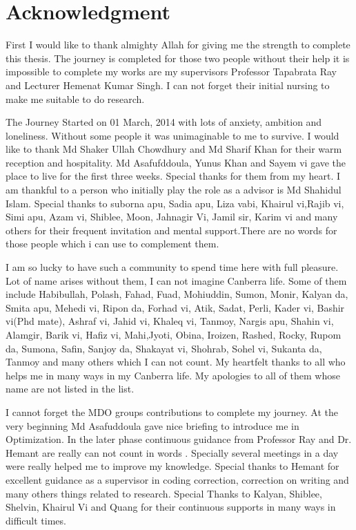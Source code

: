 \chapter*{Acknowledgment}
\pagestyle{plain}

First I would like to thank almighty Allah for giving me the strength to complete this thesis. The journey is completed for those two people without their help it is impossible to complete my works are my supervisors Professor Tapabrata Ray and Lecturer Hemenat Kumar Singh. I can not forget their initial nursing to make me suitable to do research. 

The Journey Started on 01 March, 2014 with lots of anxiety, ambition  and loneliness. Without some people it was unimaginable to me to survive. I would like to thank Md Shaker Ullah Chowdhury and Md Sharif Khan for their warm reception and hospitality.   Md Asafufddoula, Yunus Khan and Sayem vi gave the place to live for the first three weeks. Special thanks for them from my heart. I am thankful to a person who initially play the role as a advisor is Md Shahidul Islam. Special thanks to suborna apu, Sadia apu, Liza vabi, Khairul vi,Rajib vi, Simi apu, Azam vi, Shiblee, Moon, Jahnagir Vi, Jamil sir, Karim vi  and  many others for their frequent invitation and mental support.There are no words for those people which i can use to complement them.

I am so lucky to have such a community to spend time here with full pleasure. Lot of name arises without them, I can not imagine Canberra life. Some of them include Habibullah, Polash, Fahad, Fuad, Mohiuddin, Sumon, Monir, Kalyan da, Smita apu, Mehedi vi, Ripon da, Forhad vi, Atik, Sadat, Perli, Kader vi, Bashir vi(Phd mate), Ashraf vi, Jahid vi, Khaleq vi, Tanmoy, Nargis apu, Shahin vi, Alamgir, Barik vi, Hafiz vi, Mahi,Jyoti, Obina, Iroizen, Rashed, Rocky, Rupom da, Sumona, Safin, Sanjoy da, Shakayat vi, Shohrab, Sohel vi, Sukanta da, Tanmoy and many others which I can not count. My heartfelt thanks to all who helps me in many ways in my Canberra life. My apologies to all of them whose name are not listed in the list.  

I cannot forget the MDO groups contributions to complete my journey. At the very beginning Md Asafuddoula gave nice briefing to introduce me in Optimization. In the later phase continuous guidance from Professor Ray and Dr. Hemant are really can not count in words . Specially several meetings in a day were really helped me to improve my knowledge. Special thanks to Hemant for excellent guidance as a supervisor in coding correction, correction on writing and many others things related to research. Special Thanks to Kalyan, Shiblee, Shelvin, Khairul Vi and Quang for their continuous supports in many ways in difficult times.

